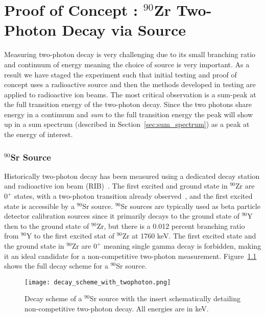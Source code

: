 \documentclass[cnatzke_thesis_proposal.tex]{subfiles}
\begin{document}
\chapter{Proof of Concept : $^{90}$Zr Two-Photon Decay via Source}
\label{sec:proof_of_concept_90sr}


Measuring two-photon decay is very challenging due to its small branching ratio and continuum of energy meaning the choice of source is very important.
As a result we have staged the experiment such that initial testing and proof of concept uses a radioactive source and then the methods developed in testing are applied to radioactive ion beams. 
The most critical observation is a sum-peak at the full transition energy of the two-photon decay. 
Since the two photons share energy in a continuum and \textit{sum} to the full transition energy the peak will show up in a sum spectrum (described in Section~\ref{sec:sum_spectrum}) as a peak at the energy of interest.

\subsection{$^{90}$Sr Source}
Historically two-photon decay has been measured using a dedicated decay station and radioactive ion beam (RIB)~\cite{kramp_nuclear_1987}.
The first excited and ground state in $^{90}$Zr are $0^+$ states, with a two-photon transition already observed~\cite{schirmer_double_1984}, and the first excited state is accessible by a $^{90}$Sr source.
$^{90}$Sr sources are typically used as beta particle detector calibration sources since it primarily decays to the ground state of $^{90}$Y then to the ground state of $^{90}$Zr, but there is a 0.012 percent branching ratio from $^{90}$Y to the first excited stat of $^{90}$Zr at 1760 keV.
The first excited state and the ground state in $^{90}$Zr are $0^+$ meaning single gamma decay is forbidden, making it an ideal candidate for a non-competitive two-photon measurement.
Figure~\ref{fig:decay_scheme_with_twophoton} shows the full decay scheme for a $^{90}$Sr source.

\begin{figure}[H]
  \centering
  \texttt{[image: decay\_scheme\_with\_twophoton.png]}
  \caption{Decay scheme of a $^{90}$Sr source with the insert schematically detailing non-competitive two-photon decay. All energies are in keV.}
  \label{fig:decay_scheme_with_twophoton}
\end{figure}
\end{document}
